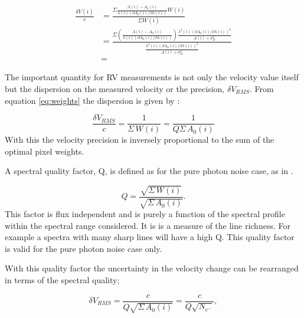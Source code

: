 \begin{eqnarray}
    \frac{\delta V(i)}{c} &= \frac{
    	\Sigma{
        	\frac{
            	A(i) - A_0(i)}{
                \lambda(i) \left(\partial A_0(i)/\partial \lambda(i)\right)} W(i)}}{
             \Sigma {W(i)}} \\
    &= \frac{
    	\Sigma  {
        	(\frac
            	{A(i) - A_0(i)}
                {\lambda(i) (\partial A_0(i)/\partial \lambda(i))}) \frac
                	{\lambda^2(i)  (\partial A_0(i)/\partial \lambda(i))^{2}}
                    {A(i) + {\sigma}^{2}_{D}}
                 } 
         }
    {\frac
    	{\lambda^2(i)  (\partial A_0(i)/\partial \lambda(i))^{2}}{A(i) + {\sigma}^{2}_{D}} 
        } \\
    &= 
    \label{eq:delta_v_eqarray}
\end{eqnarray}

The important quantity for RV measurements is not only the velocity value itself but the dispersion on the measured velocity or the precision, \(\delta V_{RMS}\). From equation \ref{eq:weights} the dispersion is given by :


\begin{equation}
    \frac{\delta V_{RMS}}{c} = \frac{1}{\Sigma {\,W(i)}} = \frac{1}{Q \Sigma {\,A_0(i)}}
\end{equation}
With this the velocity precision is  inversely proportional to the sum of the optimal pixel weights. 

A spectral quality factor, Q, is defined as  for the pure photon noise case, as in \cite{Connes1985, connes_demonstration_1996}.

\begin{equation}
Q = \frac{\sqrt{\Sigma{\,W(i)}}}{\sqrt{\Sigma{\,A_0(i)}}}.
\end{equation}
This factor is flux independent and is purely a function of the spectral profile within the spectral range considered. It is is a measure of the line richness. For example a spectra with  many sharp lines will have a high Q. This quality factor is valid for the pure photon noise case only.

With this quality factor the uncertainty in the velocity change can be rearranged in terms of the spectral quality;

\begin{equation}
    \delta V_{RMS} = \frac{c}{Q \sqrt{\Sigma {\,A_0(i)}}} = \frac{c}{Q \sqrt{{N}_{{e}^{-}}}},
\end{equation}

